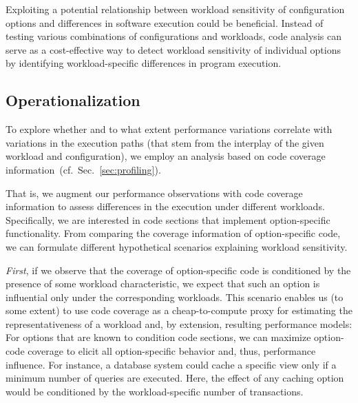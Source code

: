 {{{Exploiting a potential relationship between workload sensitivity of configuration options and differences in software execution could be beneficial. Instead of testing various combinations of configurations and workloads, code analysis can serve as a cost-effective way to detect workload sensitivity of individual options by identifying workload-specific differences in program execution.

\subsection{Operationalization}To explore whether and to what extent performance variations correlate with variations in the execution paths (that stem from the interplay of the given workload and configuration), we employ an analysis based on code coverage information~(cf.~Sec.~\ref{sec:profiling}). 

{\color{teal} %
	That is, we augment our performance observations with code coverage information to assess differences in the execution under different workloads. Specifically, we are interested in code sections that implement option-specific functionality. From comparing the coverage information of option-specific code, we can formulate different hypothetical scenarios explaining workload sensitivity. 
}

\textit{First}, if we observe that the  coverage of option-specific code is conditioned by the presence of some workload characteristic, we expect that such an option is influential only under the corresponding workloads. This scenario enables us (to some extent) to use code coverage as a cheap-to-compute proxy for estimating the representativeness of a workload and, by extension, resulting performance models: For options that are known to condition code sections, we can maximize option-code coverage to elicit all option-specific behavior and, thus, performance influence. For instance, a database system could cache a specific view only if a minimum number of queries are executed. Here, the effect of any caching option would be conditioned by the workload-specific number of transactions.

}}}
